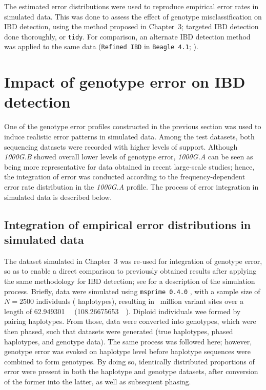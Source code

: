 The estimated error distributions were used to reproduce empirical error rates in simulated data.
This was done to assess the effect of genotype misclassification on IBD detection, using the method proposed in Chapter~3; \ie targeted IBD detection done thoroughly, or \texttt{tidy}.
For comparison, an alternate IBD detection method was applied to the same data (\texttt{Refined\,IBD} in \texttt{Beagle\,4.1}; \citealt{Browning:2013eh}).







%
\section{Impact of genotype error on IBD detection}
\label{sec:impact_error_data}
%

One of the genotype error profiles constructed in the previous section was used to induce realistic error patterns in simulated data.
Among the  test datasets, both sequencing datasets were recorded with higher levels of support.
Although \emph{1000G.B} showed overall lower levels of genotype error, \emph{1000G.A} can be seen as being more representative for data obtained in recent large-scale studies; hence, the integration of error was conducted according to the frequency-dependent error rate distribution in the \emph{1000G.A} profile.
The process of error integration in simulated data is described below.


%
\subsection{Integration of empirical error distributions in simulated data}\label{sec:create_error_data}
%

The dataset simulated in Chapter~3 was re-used for integration of genotype error, so as to enable a direct comparison to previously obtained results after applying the same methodology for IBD detection; see  for a description of the simulation process.
Briefly, data were simulated using \texttt{msprime\,0.4.0} \citep{Kelleher:2016fn}, with a sample size of ${N=\num{2500}}$ individuals (\ie {} haplotypes), resulting in ~million variant sites over a length of \SI{62.949301}{\mega\basepair} (\SI{108.26675653}{\centi\morgan}).
Diploid individuals wee formed by pairing haplotypes.
From those, data were converted into genotypes, which were then phased, such that  datasets were generated (true haplotypes, phased haplotypes, and genotype data).
The same process was followed here; however, genotype error was evoked on haplotype level before haplotype sequences were combined to form genotypes.
By doing so, identically distributed proportions of error were present in both the haplotype and genotype datasets, after conversion of the former into the latter, as well as subsequent phasing.

